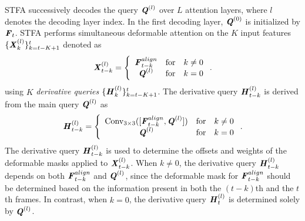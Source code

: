 \documentclass[letterpaper]{article} \usepackage{aaai23}  \usepackage{times}  \usepackage{helvet}  \usepackage{courier}  \usepackage[hyphens]{url}  \usepackage{graphicx} \urlstyle{rm} \def\UrlFont{\rm}  \usepackage{natbib}  \usepackage{caption} \frenchspacing  \setlength{\pdfpagewidth}{8.5in} \usepackage{algorithm}
\begin{document}
STFA successively decodes the query $\textbf{\textit{Q}}^{(l)}$ over $L$ attention layers, where $l$ denotes the decoding layer index. In the first decoding layer, $\textbf{\textit{Q}}^{(0)}$ is initialized by $\textbf{\textit{F}}_{t}$.
STFA performs simultaneous deformable attention on the $K$ input features $\{\textbf{\textit{X}}_{k}^{(l)}\}_{k=t-K+1}^{t}$ denoted as
\begin{align}
    \textbf{\textit{X}}_{t-k}^{(l)} = \left\{ \begin{array}{ccc} \textbf{\textit{F}}_{t-k}^{align} & \mbox{for} \quad k \neq 0 \\ 
   \textbf{\textit{Q}}^{(l)} &  \mbox{for} \quad k = 0 \end{array} \right. .
\end{align}
 using $K$ {\it derivative queries} $\{\textbf{\textit{H}}_{k}^{(l)}\}_{k=t-K+1}^{t}$.   
The derivative query $\textbf{\textit{H}}_{t-k}^{(l)}$ is derived from the main query $\textbf{\textit{Q}}^{(l)}$ as
\begin{align}
    \textbf{\textit{H}}_{t-k}^{(l)} = \left\{ \begin{array}{ccc} \mathrm{Conv}_{3 \times 3}([\textbf{\textit{F}}_{t-k}^{align}, \textbf{\textit{Q}}^{(l)}]) & \mbox{for} \quad k \neq 0 \\ 
   \textbf{\textit{Q}}^{(l)} &  \mbox{for} \quad k = 0 \end{array} \right. .
\end{align} 
The derivative query $\textbf{\textit{H}}_{t-k}^{(l)}$ is used to determine the offsets and weights of the deformable masks applied to $\textbf{\textit{X}}_{t-k}^{(l)}$. 
When $k \neq 0$, the derivative query $\textbf{\textit{H}}_{t-k}^{(l)}$ depends on both $\textbf{\textit{F}}_{t-k}^{align}$ and $\textbf{\textit{Q}}^{(l)}$, since the deformable mask for $\textbf{\textit{F}}_{t-k}^{align}$ should be determined based on the information present in both the  $(t-k)$th and the $t$th frames. 
In contrast, when $k=0$, the derivative query $\textbf{\textit{H}}_{t}^{(l)}$ is determined solely by $\textbf{\textit{Q}}^{(l)}$.
\end{document}
